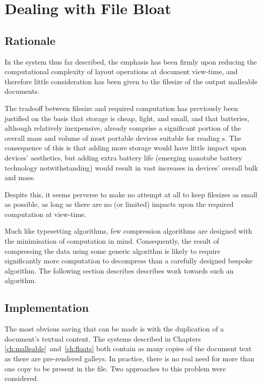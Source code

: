 \chapter{Dealing with File Bloat}\label{ch:bloat}

\section{Rationale}
In the system thus far described, the emphasis has been firmly upon reducing the computational complexity of layout operations at document view-time, and therefore little consideration has been given to the filesize of the output malleable documents.


The tradeoff between filesize and required computation has previously been justified on the basis that storage is cheap, light, and small, and that batteries, although relatively inexpensive, already comprise a significant portion of the overall mass and volume of most portable devices suitable for reading \ebook{}s. The consequence of this is that adding more storage would have little impact upon devices' aesthetics, but adding extra battery life (emerging nanotube battery technology notwithstanding) would result in vast increases in devices' overall bulk and mass.

Despite this, it seems perverse to make no attempt at all to keep filesizes as small as possible, as long as there are no (or limited) impacts upon the required computation at view-time.

Much like typesetting algorithms, few compression algorithms are designed with the minimisation of computation in mind. Consequently, the result of compressing the data using some generic algorithm is likely to require significantly more computation to decompress than a carefully designed bespoke algorithm. The following section describes describes work towards such an algorithm.


\section{Implementation}
The most obvious saving that can be made is with the duplication of a document's textual content. The systems described in Chapters \ref{ch:malleable}~and~\ref{ch:floats} both contain as many copies of the document text as there are pre-rendered galleys. In practice, there is no real need for more than one copy to be present in the file. Two approaches to this problem were considered.

